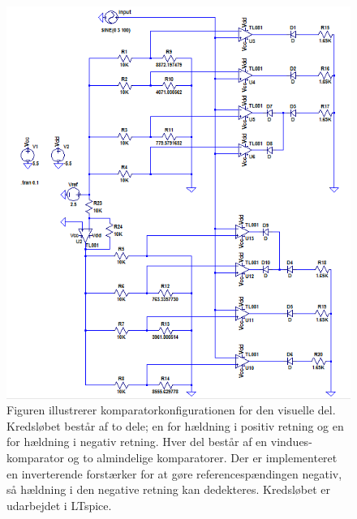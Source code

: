 \begin{figure}[H]
	\centering
	\includegraphics[scale=1.0]{figures/cProblemloesning/komparator_visuel.PNG}
	\caption{Figuren illustrerer komparatorkonfigurationen for den visuelle del. Kredsløbet består af to dele; en for hældning i positiv retning og en for hældning i negativ retning. Hver del består af en vindues-komparator og to almindelige komparatorer. Der er implementeret en inverterende forstærker for at gøre referencespændingen negativ, så hældning i den negative retning kan dedekteres. Kredsløbet er udarbejdet i LTspice.}
	\label{fig:komparator_visuel}
\end{figure}


